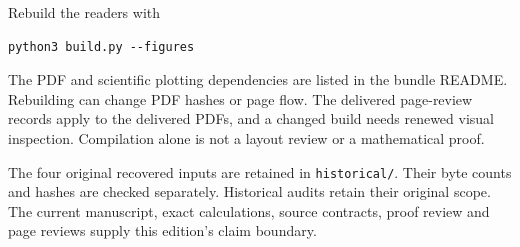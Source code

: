 Rebuild the readers with
\begin{lstlisting}
python3 build.py --figures
\end{lstlisting}
The PDF and scientific plotting dependencies are listed in the bundle README. Rebuilding can change PDF hashes or page flow. The delivered page-review records apply to the delivered PDFs, and a changed build needs renewed visual inspection. Compilation alone is not a layout review or a mathematical proof.

The four original recovered inputs are retained in \texttt{historical/}. Their byte counts and hashes are checked separately. Historical audits retain their original scope. The current manuscript, exact calculations, source contracts, proof review and page reviews supply this edition's claim boundary.
